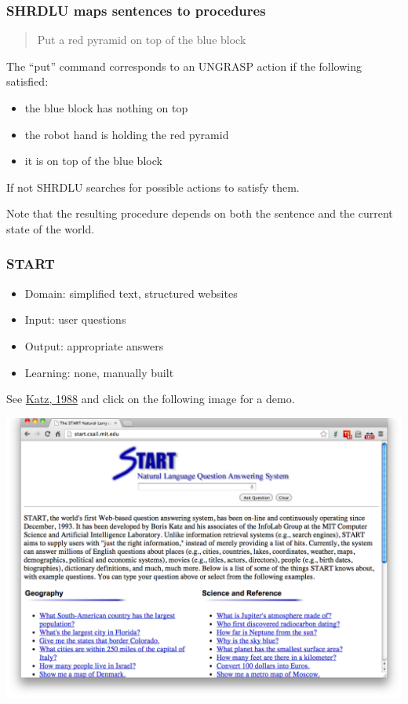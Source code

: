 \documentclass[ignorenonframetext]{beamer}
\begin{document}
\begin{frame}\frametitle{SHRDLU maps sentences to procedures}
\begin{quote}
Put a red pyramid on top of the blue block
\end{quote}

The ``put'' command corresponds to an UNGRASP action if the following satisfied:
\begin{itemize}
\item the blue block has nothing on top
\item the robot hand is holding the red pyramid
\item it is on top of the blue block
\end{itemize}
If not SHRDLU searches for possible actions to satisfy them.
\vspace*{1em}

\color{red} 
Note that the resulting procedure depends on both the sentence
and the current state of the world.
\end{frame}

\begin{frame}\frametitle{START}

\begin{itemize}
\item Domain: simplified text, structured websites
\item Input: user questions
\item Output: appropriate answers
\item Learning: none, manually built
\end{itemize}

See \href{ftp://publications.ai.mit.edu/ai-publications/pdf/AIM-1096.pdf}{Katz, 1988}
and click on the following image for a demo.

\begin{center}
\href{http://start.csail.mit.edu}{
\includegraphics[width=.7\textwidth]{images/katz-start.png}}
\end{center}

\end{frame}
\end{document}
